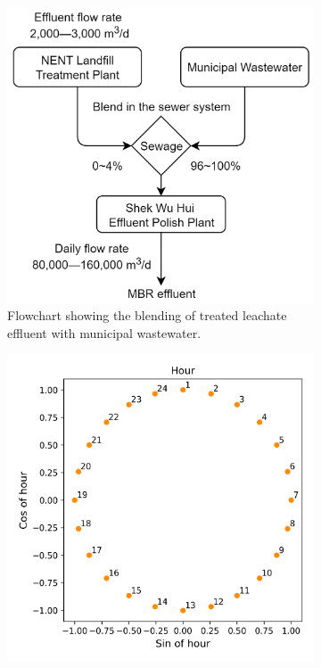 \begin{figure}[h]
    \centering
    \begin{subfigure}[t]{0.45\textwidth}
      \includegraphics[width=\linewidth]{imgs/pre-processing/blending-ratio.png}
      \caption{Flowchart showing the blending of treated leachate effluent with municipal wastewater.} \label{fig:blend-ratio}
    \end{subfigure}%
    \hspace{2em}%
    \begin{subfigure}[t]{0.45\textwidth}
      \includegraphics[width=\linewidth]{imgs/pre-processing/pos-encoding.png}

\end{subfigure}
\end{figure}
